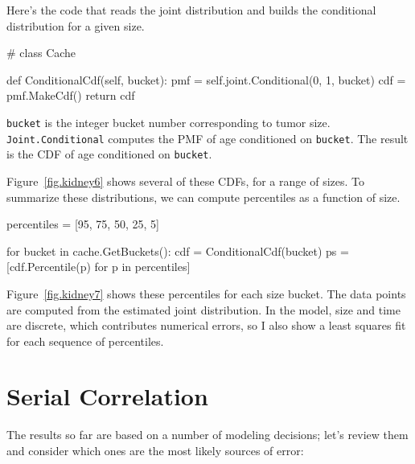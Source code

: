 \documentclass[12pt]{book}
\theoremstyle{exercise}
\begin{document}
Here's the code that reads the joint distribution and builds
the conditional distribution for a given size.

\begin{code}
# class Cache

    def ConditionalCdf(self, bucket):
        pmf = self.joint.Conditional(0, 1, bucket)
        cdf = pmf.MakeCdf()
        return cdf
\end{code}

\verb"bucket" is the integer bucket number corresponding to
tumor size.  {\tt Joint.Conditional} computes the
PMF of age conditioned on {\tt bucket}.
The result is the CDF of age conditioned on {\tt bucket}.

Figure~\ref{fig.kidney6} shows several of these CDFs, for
a range of sizes.  To summarize these distributions, we can
compute percentiles as a function of size.

\begin{code}
    percentiles = [95, 75, 50, 25, 5]

    for bucket in cache.GetBuckets():
        cdf = ConditionalCdf(bucket)      
        ps = [cdf.Percentile(p) for p in percentiles]
\end{code}

Figure~\ref{fig.kidney7} shows these percentiles for each
size bucket.  The data points are computed from the estimated
joint distribution.  In the model, size and time are discrete,
which contributes numerical errors, so I also show a least 
squares fit for each sequence of percentiles.


\section{Serial Correlation}
\label{serial}

The results so far are based on a number of modeling decisions;
let's review them and consider which ones are the most
likely sources of error:
\end{document}

